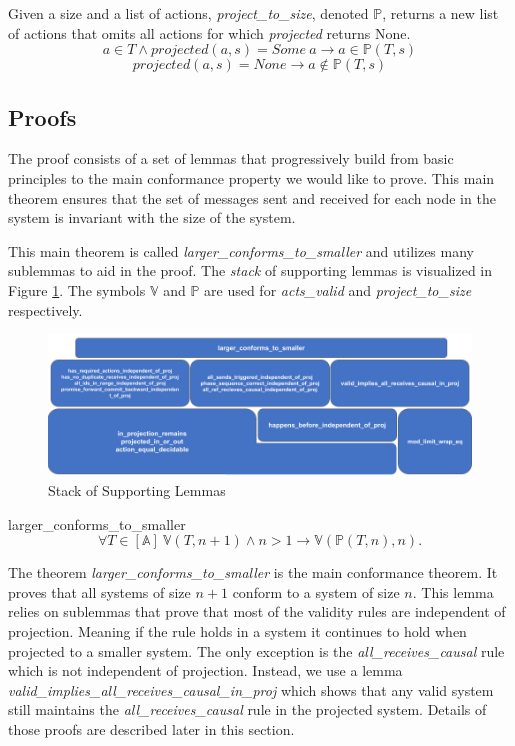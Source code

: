 \documentclass[runningheads]{llncs}
\newcommand{\action}{\mathds{A}}
\newcommand{\listaction}{[\action]}
\newcommand{\actsvalid}[2]{\mathds{V}(#1, #2)}
\newcommand{\projectsize}[2]{\mathds{P}(#1, #2)}
\newcommand{\figref}[1]{Figure \ref{#1}}
\begin{document}
\begin{definition}
Given a size and a list of actions, \emph{project\_to\_size}, denoted $\mathds{P}$, returns a new list of actions that omits all actions for which \emph{projected} returns None. 
$$
a \in T \wedge projected(a, s) = Some\ a \longrightarrow a \in \projectsize{T}{s}
$$
$$
projected(a, s) = None \longrightarrow a \notin \projectsize{T}{s}
$$
\end{definition}

\subsection{Proofs}
\label{sec:proofs}

The proof consists of a set of lemmas that progressively build from basic principles to the main conformance property we would like to prove. This main theorem ensures that the set of messages sent and received for each node in the system is invariant with the size of the system. 

This main theorem is called \sloppy \emph{larger\_conforms\_to\_smaller} and utilizes many sublemmas to aid in the proof.
The \emph{stack} of supporting lemmas is visualized in \figref{fig:coqLemmaStack}.
The symbols $\mathds{V}$ and $\mathds{P}$ are used for \emph{acts\_valid} and \emph{project\_to\_size} respectively. 

\begin{figure}[h]
    \centering
    \includegraphics[scale=0.35]{CoqLemmaStack.png}
    \caption{Stack of Supporting Lemmas}
    \label{fig:coqLemmaStack}
\end{figure}

\begin{theorem}{larger\_conforms\_to\_smaller}
\label{thm:maintheorem}
$$\forall T \in \listaction\ \actsvalid{T}{n+1} \wedge n > 1 \longrightarrow \actsvalid{\projectsize{T}{n}}{n}.$$
\end{theorem}

The theorem \emph{larger\_conforms\_to\_smaller} is the main conformance theorem. It proves that all systems of size $n+1$ conform to a system of size $n$. This lemma relies on sublemmas that prove that most of the validity rules are independent of projection. Meaning if the rule holds in a system it continues to hold when projected to a smaller system. The only exception is the \emph{all\_receives\_causal} rule which is not independent of projection. Instead, we use a lemma \emph{valid\_implies\_all\_receives\_causal\_in\_proj} which shows that any valid system still maintains the \emph{all\_receives\_causal} rule in the projected system. Details of those proofs are described later in this section. 
\end{document}
